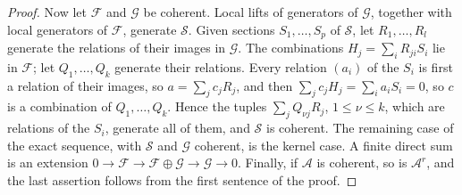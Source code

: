\begin{proof}
Now let $\mathcal F$ and $\mathcal G$ be coherent. Local lifts of generators of $\mathcal G$, together with local generators of $\mathcal F$, generate $\mathcal S$. Given sections $S_1,\ldots,S_p$ of $\mathcal S$, let $R_1,\ldots,R_l$ generate the relations of their images in $\mathcal G$. The combinations $H_j=\sum_iR_{ji}S_i$ lie in $\mathcal F$; let $Q_1,\ldots,Q_k$ generate their relations. Every relation $(a_i)$ of the $S_i$ is first a relation of their images, so $a=\sum_jc_jR_j$, and then $\sum_jc_jH_j=\sum_ia_iS_i=0$, so $c$ is a combination of $Q_1,\ldots,Q_k$. Hence the tuples $\sum_jQ_{\nu j}R_j$, $1\leq\nu\leq k$, which are relations of the $S_i$, generate all of them, and $\mathcal S$ is coherent. The remaining case of the exact sequence, with $\mathcal S$ and $\mathcal G$ coherent, is the kernel case. A finite direct sum is an extension $0\to\mathcal F\to\mathcal F\oplus\mathcal G\to\mathcal G\to0$. Finally, if $\mathcal A$ is coherent, so is $\mathcal A^r$, and the last assertion follows from the first sentence of the proof.
\end{proof}

